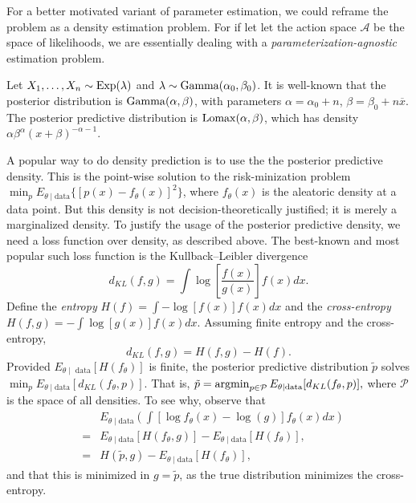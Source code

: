 For a better motivated variant of parameter estimation, we could reframe
the problem as a density estimation problem. For if let let the action
space $\mathcal{A}$ be the space of likelihoods, we are essentially
dealing with a \emph{parameterization-agnostic} estimation problem. 
\begin{example}
\label{exa:exponential estimation} Let $X_{1},\ldots,X_{n}\sim\operatorname{Exp}(\lambda)$
and $\lambda\sim\operatorname{Gamma}(\alpha_{0},\beta_{0})$. It is well-known
that the posterior distribution is $\operatorname{Gamma}(\alpha,\beta)$, with
parameters $\alpha=\alpha_{0}+n$, $\beta=\beta_{0}+n\overline{x}$.
The posterior predictive distribution is $\operatorname{Lomax}(\alpha,\beta)$,
which has density $\alpha\beta^{\alpha}(x+\beta)^{-\alpha-1}$. 

A popular way to do density prediction is to use the the posterior
predictive density. This\emph{ }is the point-wise solution to the
risk-minization problem $\min_{p}E_{\theta\mid\textrm{data}}\{[p(x)-f_{\theta}(x)]^{2}\}$,
where $f_{\theta}(x)$ is the aleatoric density at a data point. But
this density is not decision-theoretically justified; it is merely
a marginalized density. To justify the usage of the posterior predictive
density, we need a loss function over density, as described above.
The best-known and most popular such loss function is the Kullback--Leibler\emph{
}divergence \parencite{Kullback1951-kv}
\begin{equation}
d_{KL}(f,g)=\int\log\left[\frac{f(x)}{g(x)}\right]f(x)dx.\label{eq:Kullback-Leibler}
\end{equation}
 Define the \emph{entropy} $H(f)=\int-\log[f(x)]f(x)dx$ and the \emph{cross-entropy}
$H(f,g)=-\int\log[g(x)]f(x)dx$. Assuming finite entropy and the cross-entropy,
\begin{equation}
d_{KL}(f,g)=H(f,g)-H(f).\label{eq:Kullback--Leibler(entropy)}
\end{equation}
Provided $E_{\theta\mid\textrm{ data}}[H(f_{\theta})]$ is finite,
the posterior predictive distribution $\tilde{p}$ solves $\min_{p}E_{\theta\mid\textrm{data}}[d_{KL}(f_{\theta},p)]$.
That is, $\tilde{p}=\operatorname{argmin}_{p\in\mathcal{P}}E_{\theta\mid\textrm{data}}[d_{KL}(f_{\theta},p)],$
where $\mathcal{P}$ is the space of all densities. To see why, observe
that
\begin{eqnarray}
 &  & E_{\theta\mid\textrm{data}}\left(\int[\log f_{\theta}(x)-\log(g)]f_{\theta}(x)dx\right)\nonumber \\  
 & = & E_{\theta\mid\textrm{data}}[H(f_{\theta},g)]-E_{\theta\mid\textrm{data}}[H(f_{\theta})],\label{eq:cross-entropy equality}\\
 & = & H(\tilde{p},g)-E_{\theta\mid\textrm{data}}[H(f_{\theta})],\nonumber 
\end{eqnarray}
and that this is minimized in $g=\tilde{p}$, as the true distribution
minimizes the cross-entropy. 


\end{example}
